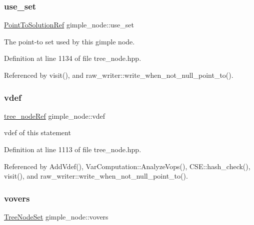\mbox{\label{structgimple__node_a0688350276799812ef62e5cbea4cfa1a}} 
\subsubsection{\texorpdfstring{use\+\_\+set}{use\_set}}
{\footnotesize\ttfamily \hyperlink{tree__node_8hpp_a4b5be0c528f25b8cb0b0fbc3b957d725}{Point\+To\+Solution\+Ref} gimple\+\_\+node\+::use\+\_\+set}



The point-\/to set used by this gimple node. 



Definition at line 1134 of file tree\+\_\+node.\+hpp.



Referenced by visit(), and raw\+\_\+writer\+::write\+\_\+when\+\_\+not\+\_\+null\+\_\+point\+\_\+to().

\mbox{\label{structgimple__node_ac3e8056bd58becfd11f356427352b6fa}} 
\subsubsection{\texorpdfstring{vdef}{vdef}}
{\footnotesize\ttfamily \hyperlink{tree__node_8hpp_a6ee377554d1c4871ad66a337eaa67fd5}{tree\+\_\+node\+Ref} gimple\+\_\+node\+::vdef}



vdef of this statement 



Definition at line 1113 of file tree\+\_\+node.\+hpp.



Referenced by Add\+Vdef(), Var\+Computation\+::\+Analyze\+Vops(), C\+S\+E\+::hash\+\_\+check(), visit(), and raw\+\_\+writer\+::write\+\_\+when\+\_\+not\+\_\+null\+\_\+point\+\_\+to().

\mbox{\label{structgimple__node_ad998aebf099744eb9aacb5425ecbb4da}} 
\subsubsection{\texorpdfstring{vovers}{vovers}}
{\footnotesize\ttfamily \hyperlink{classTreeNodeSet}{Tree\+Node\+Set} gimple\+\_\+node\+::vovers}



